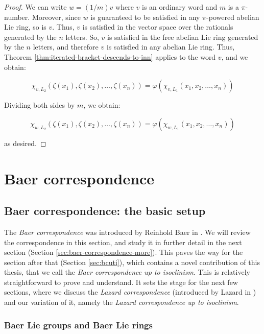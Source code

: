 \documentclass{ucetd}
\begin{document}
\begin{proof}
  We can write $w = (1/m)v$ where $v$ is an ordinary word and $m$ is a
  $\pi$-number. Moreover, since $w$ is guaranteed to be satisfied in
  any $\pi$-powered abelian Lie ring, so is $v$. Thus, $v$ is
  satisfied in the vector space over the rationals generated by the
  $n$ letters. So, $v$ is satisfied in the free abelian Lie ring
  generated by the $n$ letters, and therefore $v$ is satisfied in any
  abelian Lie ring. Thus, Theorem
  \ref{thm:iterated-bracket-descends-to-inn} applies to the word
  $v$, and we obtain:

  $$\chi_{v,L_2}(\zeta(x_1),\zeta(x_2),\dots,\zeta(x_n)) = \varphi(\chi_{v,L_1}(x_1,x_2,\dots,x_n))$$

  Dividing both sides by $m$, we obtain:

  $$\chi_{w,L_2}(\zeta(x_1),\zeta(x_2),\dots,\zeta(x_n)) = \varphi(\chi_{w,L_1}(x_1,x_2,\dots,x_n))$$

  as desired.
\end{proof}

\chapter{Baer correspondence}

\section{Baer correspondence: the basic setup}\label{sec:baer-correspondence-basics}

The {\em Baer correspondence} was introduced by Reinhold Baer in
\cite{Baer38}. We will review the correspondence in this section, and
study it in further detail in the next section (Section
\ref{sec:baer-correspondence-more}). This paves the way for the
section after that (Section \ref{sec:bcuti}), which contains a novel
contribution of this thesis, that we call the {\em Baer correspondence
  up to isoclinism}. This is relatively straightforward to prove and
understand. It sets the stage for the next few sections, where we
discuss the {\em Lazard correspondence} (introduced by Lazard in
\cite{Lazardsoriginal}) and our variation of it, namely the {\em
  Lazard correspondence up to isoclinism}.

\subsection{Baer Lie groups and Baer Lie rings}\label{sec:baer-lie-definitions}
\end{document}
